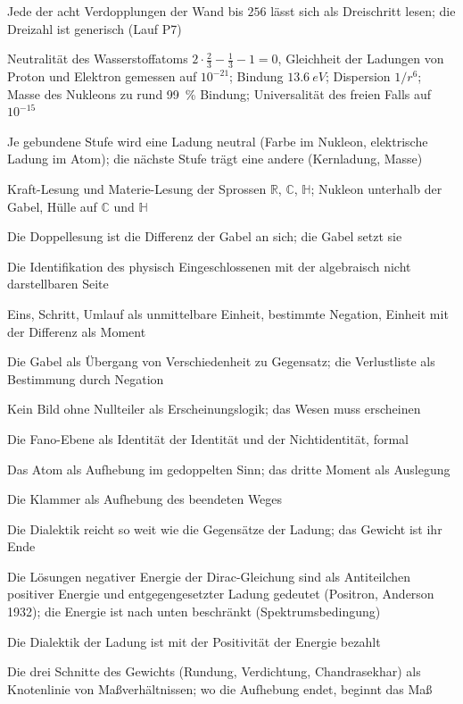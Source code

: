 \documentclass[11pt,a4paper]{article}
\newcommand{\R}{\mathbb R}
\newcommand{\C}{\mathbb C}
\newcommand{\HH}{\mathbb H}
\begin{document}
\begin{description}[itemsep=1pt,font=\normalfont\bfseries]
\item[Satz:] Jede der acht Verdopplungen der Wand bis $256$ lässt sich als Dreischritt lesen; die Dreizahl ist generisch (Lauf P7)
\item[Befund:] Neutralität des Wasserstoffatoms $2\cdot\tfrac23-\tfrac13-1=0$, Gleichheit der Ladungen von Proton und Elektron gemessen auf $10^{-21}$; Bindung $\SI{13.6}{eV}$; Dispersion $1/r^6$; Masse des Nukleons zu rund \SI{99}{\percent} Bindung; Universalität des freien Falls auf $10^{-15}$
\item[Befund:] Je gebundene Stufe wird eine Ladung neutral (Farbe im Nukleon, elektrische Ladung im Atom); die nächste Stufe trägt eine andere (Kernladung, Masse)
\item[These:] Kraft-Lesung und Materie-Lesung der Sprossen $\R$, $\C$, $\HH$; Nukleon unterhalb der Gabel, Hülle auf $\C$ und $\HH$
\item[These:] Die Doppellesung ist die Differenz der Gabel an sich; die Gabel setzt sie
\item[These:] Die Identifikation des physisch Eingeschlossenen mit der algebraisch nicht darstellbaren Seite
\item[Deutung:] Eins, Schritt, Umlauf als unmittelbare Einheit, bestimmte Negation, Einheit mit der Differenz als Moment
\item[Deutung:] Die Gabel als Übergang von Verschiedenheit zu Gegensatz; die Verlustliste als Bestimmung durch Negation
\item[Deutung:] Kein Bild ohne Nullteiler als Erscheinungslogik; das Wesen muss erscheinen
\item[Deutung:] Die Fano-Ebene als Identität der Identität und der Nichtidentität, formal
\item[Deutung:] Das Atom als Aufhebung im gedoppelten Sinn; das dritte Moment als Auslegung
\item[Deutung:] Die Klammer als Aufhebung des beendeten Weges
\item[Deutung:] Die Dialektik reicht so weit wie die Gegensätze der Ladung; das Gewicht ist ihr Ende
\item[Befund:] Die Lösungen negativer Energie der Dirac-Gleichung sind als Antiteilchen positiver Energie und entgegengesetzter Ladung gedeutet (Positron, Anderson 1932); die Energie ist nach unten beschränkt (Spektrumsbedingung)
\item[Deutung:] Die Dialektik der Ladung ist mit der Positivität der Energie bezahlt
\item[Deutung:] Die drei Schnitte des Gewichts (Rundung, Verdichtung, Chandrasekhar) als Knotenlinie von Maßverhältnissen; wo die Aufhebung endet, beginnt das Maß

\end{description}
\end{document}
